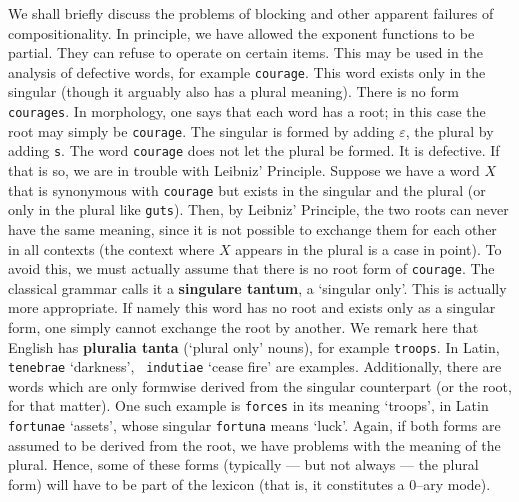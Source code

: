 We shall briefly discuss the problems of blocking and other apparent
failures of compositionality. In principle, we have allowed
the exponent functions to be partial. They can refuse to operate
on certain items. This may be used in the analysis
of defective words, for example {\tt courage}. This word exists
only in the singular (though it arguably also has a plural meaning). 
There is no form {\tt courages}. In morphology, one says that each 
word has a root; in this case the root may simply be {\tt courage}.
The singular is formed by adding $\varepsilon$, the plural by adding
{\tt s}. The word {\tt courage} does not let the plural be formed. 
It is defective. If that is so, we are in trouble with Leibniz' 
Principle.  Suppose we have a word $X$ that is synonymous with 
{\tt courage} but exists in the singular and the plural (or only 
in the plural like {\tt guts}). Then, by Leibniz' Principle, the two roots 
can never have the same meaning, since it is not possible to exchange 
them for each other in all contexts (the context where $X$ appears in 
the plural is a case in point). To avoid this, we must actually assume 
that there is no root form of {\tt courage}.
The classical grammar calls it a \textbf{singulare tantum}, a 
`singular only'. This is actually more appropriate. If namely this
word has no root and exists only as a singular form, one simply
cannot exchange the root by another. We remark here that English
has \textbf{pluralia tanta} (`plural only' nouns), for example
{\tt troops}. In Latin, {\tt tenebrae} `darkness', {\tt
indutiae} `cease fire' are examples. Additionally, there are 
words which are only formwise derived from the singular
counterpart (or the root, for that matter). One such example is
{\tt forces} in its meaning `troops', in Latin {\tt fortunae} 
`assets', whose singular {\tt fortuna} means `luck'. Again, if
both forms are assumed to be derived from the root, we have
problems with the meaning of the plural. Hence, some of these forms
(typically --- but not always --- the plural form) will have to 
be part of the lexicon (that is, it constitutes a 0--ary mode).

